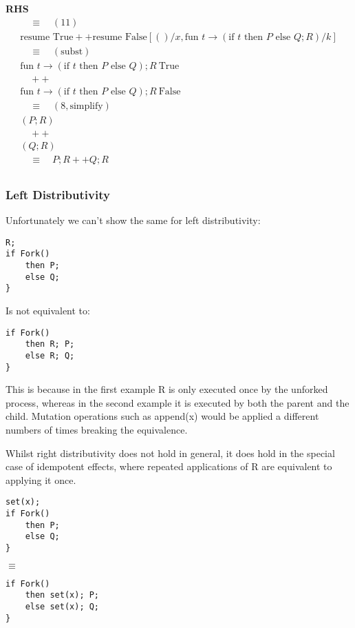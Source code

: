 \documentclass[logo,bsc,singlespacing,parskip]{infthesis}
\begin{document}
\textbf{RHS}
\[
\begin{array}{l}
\quad\equiv\quad (11) \\[5pt]
\text{resume True} ++ \text{resume False} [()/x, \text{fun } t \rightarrow (\text{if } t \text{ then } P \text{ else } Q;R) / k] \\[5pt]
\quad\equiv\quad (\text{subst}) \\[5pt]
\text{fun } t \rightarrow (\text{if } t \text{ then } P \text{ else } Q);R\ \text{True} \\[2pt]
\quad ++ \\
\text{fun } t \rightarrow (\text{if } t \text{ then } P \text{ else } Q);R\ \text{False} \\[5pt]
\quad\equiv\quad (8, \text{simplify}) \\[5pt]
(P;R) \\[2pt]
\quad ++ \\
(Q;R) \\[5pt]
\quad\equiv\quad P;R ++ Q;R \\[1em]
\end{array}
\]



\subsubsection*{Left Distributivity}

Unfortunately we can't show the same for left distributivity:

\begin{lstlisting}
R;
if Fork()
    then P;
    else Q;
}
\end{lstlisting}
Is not equivalent to:
\begin{lstlisting}
if Fork()
    then R; P; 
    else R; Q; 
}
\end{lstlisting}
This is because in the first example R is only executed once by the unforked process, whereas in the second example it is executed by both the parent and the child. 
Mutation operations such as append(x) would be applied a different numbers of times breaking the equivalence.

Whilst right distributivity does not hold in general, it does hold in the special case of idempotent effects, where repeated applications of R are equivalent to applying it once.

\begin{lstlisting}
set(x);
if Fork()
    then P;
    else Q;
}
\end{lstlisting}
$\equiv$
\begin{lstlisting}
if Fork()
    then set(x); P;
    else set(x); Q;
}
\end{lstlisting}
\end{document}
